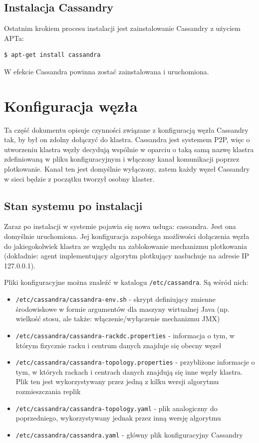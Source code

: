 \documentclass{article}
\begin{document}
\subsection{Instalacja Cassandry}

Ostatnim krokiem procesu instalacji jest zainstalowanie Cassandry z użyciem APTa:
\begin{lstlisting}[style=bash, caption={instalacja Cassandry}]
$ apt-get install cassandra
\end{lstlisting}

W efekcie Cassandra powinna zostać zainstalowana i uruchomiona.

\section{Konfiguracja węzła}

Ta część dokumentu opisuje czynności związane z konfiguracją węzła Cassandry tak, by był on zdolny dołączyć do klastra. Cassandra jest systemem P2P, więc o utworzeniu klastra węzły decydują wspólnie w oparciu o taką samą nazwę klastra zdefiniowaną w pliku konfiguracyjnym i włączony kanał komunikacji poprzez plotkowanie. Kanał ten jest domyślnie wyłączony, zatem każdy węzeł Cassandry w sieci będzie z początku tworzył osobny klaster.

\subsection{Stan systemu po instalacji}\label{system_state}

Zaraz po instalacji w systemie pojawia się nowa usługa: cassandra. Jest ona domyślnie uruchomiona. Jej konfiguracja zapobiega możliwości dołączenia węzła do jakiegokolwiek klastra ze względu na zablokowanie mechanizmu plotkowania (dokładnie: agent implementujący algorytm plotkujący nasłuchuje na adresie IP 127.0.0.1).

Pliki konfiguracyjne można znaleźć w katalogu \lstinline[style=bash]!/etc/cassandra!. Są wśród nich:
\begin{itemize}
\item \lstinline[style=bash]!/etc/cassandra/cassandra-env.sh! - skrypt definiujący zmienne środowiskowe w formie argumentów dla maszyny wirtualnej Java (np. wielkość stosu, ale także: włączenie/wyłączenie mechanizmu JMX)
\item \lstinline[style=bash]!/etc/cassandra/cassandra-rackdc.properties! - informacja o tym, w którym fizycznie racku i centrum danych znajduje się obecny węzeł
\item \lstinline[style=bash]!/etc/cassandra/cassandra-topology.properties! - przybliżone informacje o tym, w których rackach i centrach danych znajdują się inne węzły klastra. Plik ten jest wykorzystywany przez jedną z kilku wersji algorytmu rozmieszczania replik
\item \lstinline[style=bash]!/etc/cassandra/cassandra-topology.yaml! - plik analogiczny do poprzedniego, wykorzystywany jednak przez inną wersję algorytmu
\item \lstinline[style=bash]!/etc/cassandra/cassandra.yaml! - główny plik konfiguracyjny Cassandry
\end{itemize}
\end{document}

